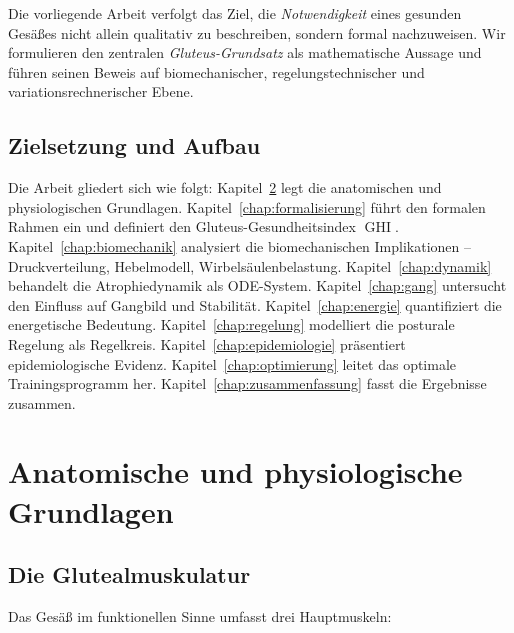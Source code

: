 ﻿\documentclass[12pt,a4paper]{report}
\theoremstyle{plain}
\theoremstyle{definition}
\theoremstyle{remark}
\DeclareMathOperator{\GHI}{GHI}
\begin{document}
	Die vorliegende Arbeit verfolgt das Ziel, die \emph{Notwendigkeit} eines
	gesunden Gesäßes nicht allein qualitativ zu beschreiben, sondern formal
	nachzuweisen. Wir formulieren den zentralen \emph{Gluteus-Grundsatz}
	als mathematische Aussage und führen seinen Beweis auf biomechanischer,
	regelungstechnischer und variationsrechnerischer Ebene.
	
	\section{Zielsetzung und Aufbau}
	
	Die Arbeit gliedert sich wie folgt:
	Kapitel~\ref{chap:anatomie} legt die anatomischen und physiologischen Grundlagen.
	Kapitel~\ref{chap:formalisierung} führt den formalen Rahmen ein und definiert
	den Gluteus-Gesundheitsindex $\GHI$.
	Kapitel~\ref{chap:biomechanik} analysiert die biomechanischen Implikationen
	-- Druckverteilung, Hebelmodell, Wirbelsäulenbelastung.
	Kapitel~\ref{chap:dynamik} behandelt die Atrophiedynamik als ODE-System.
	Kapitel~\ref{chap:gang} untersucht den Einfluss auf Gangbild und Stabilität.
	Kapitel~\ref{chap:energie} quantifiziert die energetische Bedeutung.
	Kapitel~\ref{chap:regelung} modelliert die posturale Regelung als Regelkreis.
	Kapitel~\ref{chap:epidemiologie} präsentiert epidemiologische Evidenz.
	Kapitel~\ref{chap:optimierung} leitet das optimale Trainingsprogramm her.
	Kapitel~\ref{chap:zusammenfassung} fasst die Ergebnisse zusammen.
	
	\chapter{Anatomische und physiologische Grundlagen}
	\label{chap:anatomie}
	
	\section{Die Glutealmuskulatur}
	
	Das Gesäß im funktionellen Sinne umfasst drei Hauptmuskeln:
	
\end{document}
